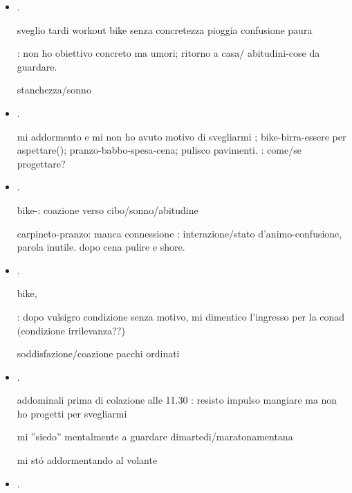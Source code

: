 \begin{itemize}
pacinotti lentezza programmazione sonno loquor impacciato: adesso c'\'e ombra riapro avvolgibile

come incomincio ad addormentarmi?

\item {}.

sveglio tardi workout bike senza concretezza pioggia confusione paura 

: non ho obiettivo concreto ma umori; ritorno a casa/ abitudini-cose da guardare.

stanchezza/sonno

\item {}.

mi addormento e mi non ho avuto motivo di svegliarmi ; bike-birra-essere per aspettare(); pranzo-babbo-spesa-cena; pulisco pavimenti.
: come/se progettare?

\item {}.

bike-: coazione verso cibo/sonno/abitudine

carpineto-pranzo: manca connessione
: interazione/stato d'animo-confusione, parola inutile.
dopo cena pulire e shore.

\item {}.

bike, 

: dopo vulsigro condizione senza motivo, mi dimentico l'ingresso per la conad (condizione irrilevanza??)

soddisfazione/coazione pacchi ordinati

\item {}.

addominali prima di colazione alle 11.30 : resisto impulso mangiare ma non ho progetti per svegliarmi

mi ''siedo'' mentalmente a guardare dimartedi/maratonamentana

mi st\'o addormentando al volante

\item {}.


\end{itemize}
